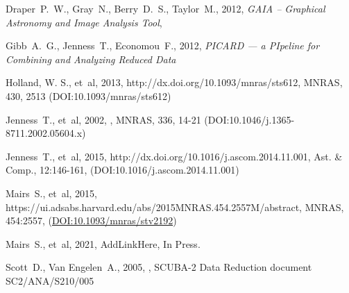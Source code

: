 \documentclass[11pt,oneside,chapters]{starlink}
\begin{document}
\begin{thebibliography}{}
Draper~P.~W., Gray~N., Berry~D.~S., Taylor~M., 2012,
\textit{GAIA -- Graphical Astronomy and Image Analysis Tool},

Gibb~A.~G., Jenness~T., Economou~F., 2012, \textit{PICARD --- a
PIpeline for Combining and Analyzing Reduced Data}

Holland, W. S., et~al, 2013, 
{http://dx.doi.org/10.1093/mnras/sts612}, MNRAS, 430, 2513
(DOI:10.1093/mnras/sts612)

Jenness~T., et~al, 2002, ,
MNRAS, 336, 14-21 (DOI:10.1046/j.1365-8711.2002.05604.x)

Jenness~T., et~al, 2015,
 {http://dx.doi.org/10.1016/j.ascom.2014.11.001},
Ast. \& Comp., 12:146-161, (DOI:10.1016/j.ascom.2014.11.001)

Mairs~S., et~al, 2015,
 {https://ui.adsabs.harvard.edu/abs/2015MNRAS.454.2557M/abstract},
MNRAS, 454:2557, (\href{https://doi.org/10.1093/mnras/stv2192}{DOI:10.1093/mnras/stv2192})

Mairs~S., et~al, 2021,
{AddLinkHere}, In Press.

Scott~D., Van Engelen~A., 2005, ,
SCUBA-2 Data Reduction document SC2/ANA/S210/005

\end{thebibliography}

\newpage
\appendix

\newpage

\newpage

\newpage

\newpage

\newpage

\newpage

\newpage

\newpage

\end{document}
